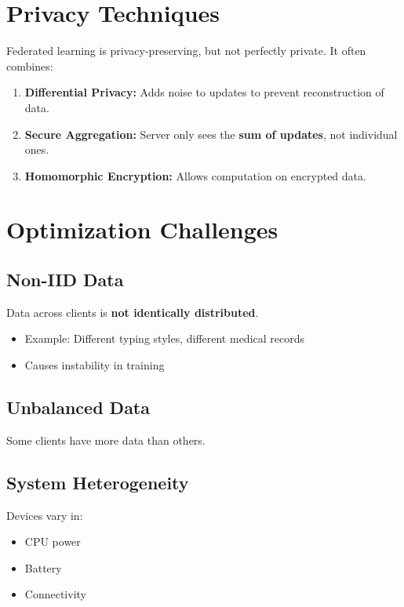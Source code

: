 \documentclass[12pt]{article}
\begin{document}
\section{Privacy Techniques}
\label{sec:privacy}

Federated learning is privacy-preserving, but not perfectly private. It often combines:

\begin{enumerate}
    \item \textbf{Differential Privacy:} Adds noise to updates to prevent reconstruction of data.
    \item \textbf{Secure Aggregation:} Server only sees the \textbf{sum of updates}, not individual ones.
    \item \textbf{Homomorphic Encryption:} Allows computation on encrypted data.
\end{enumerate}

\section{Optimization Challenges}
\label{sec:challenges}

\subsection{Non-IID Data}
Data across clients is \textbf{not identically distributed}.
\begin{itemize}
    \item Example: Different typing styles, different medical records
    \item Causes instability in training
\end{itemize}

\subsection{Unbalanced Data}
Some clients have more data than others.

\subsection{System Heterogeneity}
Devices vary in:
\begin{itemize}
    \item CPU power
    \item Battery
    \item Connectivity
\end{itemize}
\end{document}
